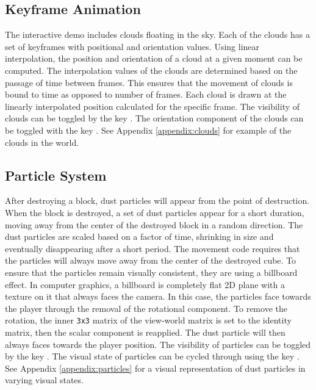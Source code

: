 \documentclass[a4paper,11pt,titlepage]{scrartcl}
\begin{document}
\subsection{Keyframe Animation}
\label{section:animation}
The interactive demo includes clouds floating in the sky. Each of the clouds has a set of keyframes with positional and orientation values. Using linear interpolation, the position and orientation of a cloud at a given moment can be computed. The interpolation values of the clouds are determined based on the passage of time between frames. This ensures that the movement of clouds is bound to time as opposed to number of frames. Each cloud is drawn at the linearly interpolated position calculated for the specific frame.
\vskip 2.5mm\noindent
The visibility of clouds can be toggled by the key . The orientation component of the clouds can be toggled with the key . See Appendix \ref{appendix:clouds} for example of the clouds in the world.

\subsection{Particle System}
\label{section:particles}
After destroying a block, dust particles will appear from the point of destruction. When the block is destroyed, a set of dust particles appear for a short duration, moving away from the center of the destroyed block in a random direction. The dust particles are scaled based on a factor of time, shrinking in size and eventually disappearing after a short period. The movement code requires that the particles will always move away from the center of the destroyed cube. To ensure that the particles remain visually consistent, they are using a billboard effect. In computer graphics, a billboard is completely flat 2D plane with a texture on it that always faces the camera. In this case, the particles face towards the player through the removal of the rotational component. To remove the rotation, the inner \texttt{3x3} matrix of the view-world matrix is set to the identity matrix, then the scalar component is reapplied. The dust particle will then always faces towards the player position.
\vskip 2.5mm\noindent
The visibility of particles can be toggled by the key . The visual state of particles can be cycled through using the key . See Appendix \ref{appendix:particles} for a visual representation of dust particles in varying visual states.
\end{document}
